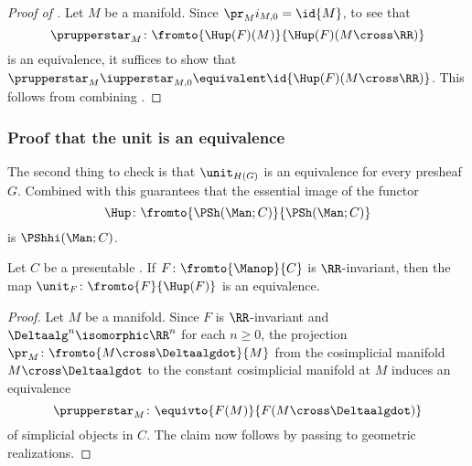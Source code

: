 \begin{proof}[Proof of ]
	Let $ M $ be a manifold.
	Since $ \pr_M i_{M,0} = \id{M} $, to see that
	\begin{equation*}
		\prupperstar_M \colon \fromto{\Hup(F)(M)}{\Hup(F)(M \cross \RR)}
	\end{equation*}
	is an equivalence, it suffices to show that $ \prupperstar_M \iupperstar_{M,0} \equivalent \id{\Hup(F)(M \cross \RR)} $.
	This follows from combining .
\end{proof}


\subsubsection{Proof that the unit is an equivalence}

The second thing to check is that $ \unit_{H(G)} $ is an equivalence for every presheaf $ G $.
Combined with  this guarantees that the essential image of the functor
\begin{equation*}
	\Hup \colon \fromto{\PSh(\Man;C)}{\PSh(\Man;C)}
\end{equation*}
is $ \PShhi(\Man;C) $.

\begin{lemma}\label{lem:Hofhiishi}
	Let $ C $ be a presentable \category.
	If $ F \colon \fromto{\Manop}{C} $ is $ \RR $-invariant, then the map $ \unit_F \colon \fromto{F}{\Hup(F)} $ is an equivalence.
\end{lemma}

\begin{proof}
	Let $ M $ be a manifold.
	Since $ F $ is $ \RR $-invariant and $ \Deltaalg^n \isomorphic \RR^n $ for each $ n \geq 0 $, the projection  $ \pr_M \colon \fromto{M \cross \Deltaalgdot}{M} $ from the cosimplicial manifold $ M \cross \Deltaalgdot $ to the constant cosimplicial manifold at $ M $ induces an equivalence
	\begin{equation*}
		\prupperstar_M \colon \equivto{F(M)}{F(M \cross \Deltaalgdot)} 
	\end{equation*}
	of simplicial objects in $ C $.
	The claim now follows by passing to geometric realizations.
\end{proof}

